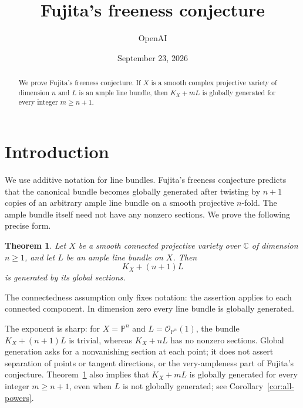 \documentclass[11pt]{article}
\title{Fujita's freeness conjecture}
\author{OpenAI}
\date{September 23, 2026}
\numberwithin{equation}{section}
\newtheorem{theorem}{Theorem}[section]
\theoremstyle{definition}
\theoremstyle{remark}
\newcommand{\C}{\mathbb C}
\newcommand{\cO}{\mathcal O}
\begin{document}
\maketitle
\begin{abstract}
We prove Fujita's freeness conjecture. If $X$ is a smooth complex
projective variety of dimension $n$ and $L$ is an ample line bundle,
then $K_X+mL$ is globally generated for every integer $m\geq n+1$.
\end{abstract}

\section{Introduction}
We use additive notation for line bundles. Fujita's freeness conjecture
\cite{fujita1987}
predicts that the canonical bundle becomes globally generated after
twisting by $n+1$ copies of an arbitrary ample line bundle on a smooth
projective $n$-fold. The ample bundle itself need not have any nonzero
sections. We prove the following precise form.

\begin{theorem}\label{thm:main}
Let $X$ be a smooth connected projective variety over $\C$ of dimension
$n\geq 1$, and let $L$ be an ample line bundle on $X$. Then
\[
                    K_X+(n+1)L
\]
is generated by its global sections.
\end{theorem}

The connectedness assumption only fixes notation: the assertion applies
to each connected component. In dimension zero every line bundle is
globally generated.

The exponent is sharp: for $X=\mathbb P^n$ and $L=\cO_{\mathbb P^n}(1)$,
the bundle $K_X+(n+1)L$ is trivial, whereas $K_X+nL$ has no nonzero
sections. Global generation asks for a nonvanishing section at each
point; it does not assert separation of points or tangent directions,
or the very-ampleness part of Fujita's conjecture.
Theorem~\ref{thm:main} also implies that $K_X+mL$ is globally generated
for every integer $m\geq n+1$, even when $L$ is not globally generated;
see Corollary~\ref{cor:all-powers}.
\end{document}
